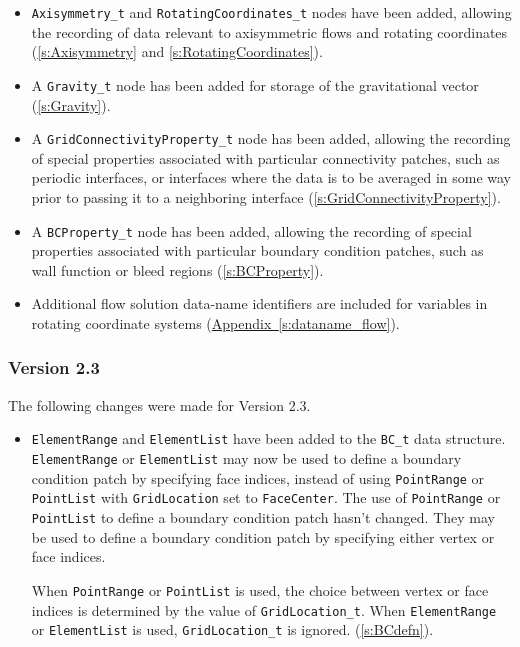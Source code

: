 \begin{itemize}
\item \texttt{Axisymmetry\_t} and \texttt{RotatingCoordinates\_t} 
      nodes have been added, allowing the recording of data relevant
      to axisymmetric flows and rotating coordinates
      (\autoref{s:Axisymmetry} and \autoref{s:RotatingCoordinates}).
\item A \texttt{Gravity\_t} node has been added for storage of the
      gravitational vector (\autoref{s:Gravity}).
\item A \texttt{GridConnectivityProperty\_t} node has been added, allowing
      the recording of special properties associated with particular
      connectivity patches, such as periodic interfaces, or interfaces
      where the data is to be averaged in some way prior to passing it
      to a neighboring interface (\autoref{s:GridConnectivityProperty}).
\item A \texttt{BCProperty\_t} node has been added, allowing the recording
      of special properties associated with particular boundary
      condition patches, such as wall function or bleed regions
      (\autoref{s:BCProperty}).
\item Additional flow solution data-name identifiers are included
      for variables in rotating coordinate systems
      (\hyperref[s:dataname_flow]{Appendix~\ref*{s:dataname_flow}}).
\end{itemize}

\subsubsection{Version 2.3}
The following changes were made for Version 2.3.

\begin{itemize}
\item \texttt{ElementRange} and \texttt{ElementList} have been added to the
      \texttt{BC\_t} data structure.
      \texttt{ElementRange} or \texttt{ElementList} may now be used
      to define a boundary condition patch by specifying face indices,
      instead of using \texttt{PointRange} or \texttt{PointList} with
      \texttt{GridLocation} set to \texttt{FaceCenter}.
      The use of \texttt{PointRange} or \texttt{PointList} to define a
      boundary condition patch hasn't changed.
      They may be used to define a boundary condition patch by specifying
      either vertex or face indices.

      When \texttt{PointRange} or \texttt{PointList} is used, the choice
      between vertex or face indices is determined by the value of
      \texttt{GridLocation\_t}.
      When \texttt{ElementRange} or \texttt{ElementList} is used,
      \texttt{GridLocation\_t} is ignored.
      (\autoref{s:BCdefn}).
\end{itemize}

